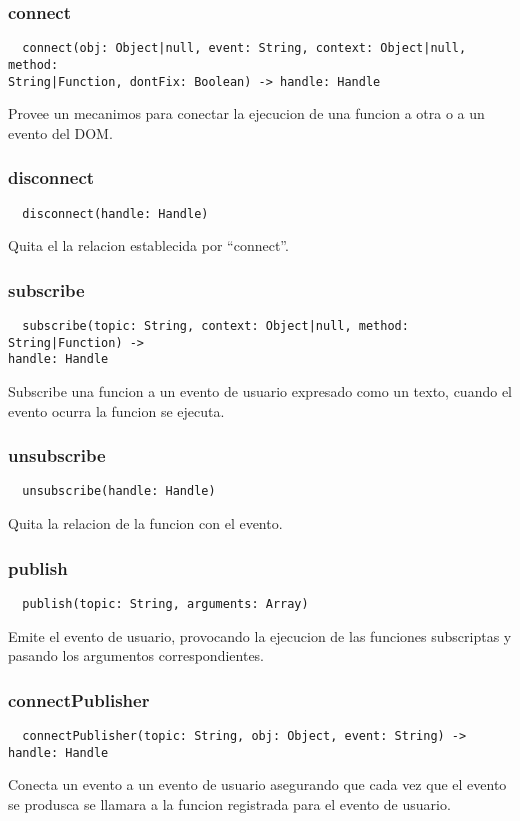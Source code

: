 \subsubsection*{connect}
\begin{verbatim}
  connect(obj: Object|null, event: String, context: Object|null, method:
String|Function, dontFix: Boolean) -> handle: Handle 
\end{verbatim}
Provee un mecanimos para conectar la ejecucion de una funcion a otra o a un
evento del DOM.  

\subsubsection*{disconnect}
\begin{verbatim}
  disconnect(handle: Handle)
\end{verbatim}
Quita el la relacion establecida por ``connect''.

\subsubsection*{subscribe}
\begin{verbatim}
  subscribe(topic: String, context: Object|null, method: String|Function) ->
handle: Handle
\end{verbatim}
Subscribe una funcion a un evento de usuario expresado como un texto, cuando el
evento ocurra la funcion se ejecuta.

\subsubsection*{unsubscribe}
\begin{verbatim}
  unsubscribe(handle: Handle)
\end{verbatim}
Quita la relacion de la funcion con el evento. 

\subsubsection*{publish}
\begin{verbatim}
  publish(topic: String, arguments: Array)
\end{verbatim}
Emite el evento de usuario, provocando la ejecucion de las funciones subscriptas
y pasando los argumentos correspondientes.

\subsubsection*{connectPublisher}
\begin{verbatim}
  connectPublisher(topic: String, obj: Object, event: String) -> handle: Handle
\end{verbatim}
Conecta un evento a un evento de usuario asegurando que cada vez que el evento
se produsca se llamara a la funcion registrada para el evento de usuario.

